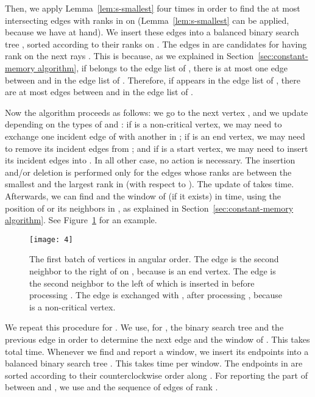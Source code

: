 \documentclass[11pt, a4paper]{article}
\begin{document}
Then, we apply Lemma~\ref{lem:s-smallest} four times in order to find 
the at most  intersecting edges with ranks in 
 on 
(Lemma~\ref{lem:s-smallest} can be applied, because we have 
 at hand). We insert these edges 
into a balanced binary search tree , sorted according to 
their ranks on . The edges in  are candidates for having 
rank  on the next  rays . This is because,
as we explained in Section~\ref{sec:constant-memory algorithm}, 
if  belongs to the edge list of , there is at 
most one edge between  and  in the edge 
list of .
Therefore, if  appears in the edge list of , 
there are at most  edges between  and
 in the edge list of . 

Now the algorithm proceeds as follows: we go to the next vertex 
, and we update  depending on the types of  and  
: if  is a non-critical vertex, we may need to exchange one 
incident edge of  with another in ; if  is an end vertex, 
we may need to remove its incident edges from ; and if 
 is a start vertex, we may need to 
insert its incident edges into .
In all other case, no action is necessary.
The insertion and/or deletion is performed only for the edges
whose ranks are between the smallest and the 
largest rank in  (with respect to ). The update of   
takes  time. Afterwards, we can find  and the 
window of  (if it exists) in  time, using the position 
of  or its neighbors in , as explained in 
Section~\ref{sec:constant-memory algorithm}.
See Figure~\ref{fig:fig4} for an example.

\begin{figure}
 \centering 
 \texttt{[image: 4]}
\caption{The first batch  of  vertices 
  in angular order. The edge  is the second neighbor to the 
  right of  on , because  is an end vertex. 
  The edge  is the second neighbor to the left of  
  which is inserted in  before processing . 
  The edge  is exchanged with , after processing 
  , because  is a non-critical vertex.}
\label{fig:fig4}
\end{figure}


We repeat this procedure for . We use, for 
, the binary search tree  and the previous edge 
 in order to determine the next edge  and 
the window of . This takes   total time. 
Whenever we find and report a window, we insert its endpoints into 
a balanced binary search tree . This takes  time 
per window. The endpoints in  are sorted according to 
their counterclockwise order along . For reporting 
the part of  between  and , we use 
 and the sequence 
of edges of rank . 
\end{document}
